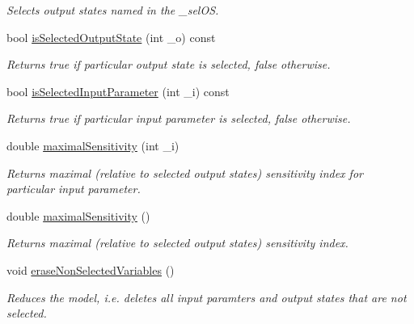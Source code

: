 \begin{DoxyCompactItemize}
\begin{DoxyCompactList}\small\item\em Selects output states named in the \-\_\-sel\-O\-S. \end{DoxyCompactList}\item 
bool \hyperlink{class_go_s_u_m_1_1_c_reduction_a7829e3f9ccd7ebaba29f872aef3072fa}{is\-Selected\-Output\-State} (int \-\_\-o) const 
\begin{DoxyCompactList}\small\item\em Returns true if particular output state is selected, false otherwise. \end{DoxyCompactList}\item 
bool \hyperlink{class_go_s_u_m_1_1_c_reduction_ae930cb202b2a6bda3fceba0b676b9389}{is\-Selected\-Input\-Parameter} (int \-\_\-i) const 
\begin{DoxyCompactList}\small\item\em Returns true if particular input parameter is selected, false otherwise. \end{DoxyCompactList}\item 
double \hyperlink{class_go_s_u_m_1_1_c_reduction_ad510f8a29bce3c9600300926387b6234}{maximal\-Sensitivity} (int \-\_\-i)
\begin{DoxyCompactList}\small\item\em Returns maximal (relative to selected output states) sensitivity index for particular input parameter. \end{DoxyCompactList}\item 
double \hyperlink{class_go_s_u_m_1_1_c_reduction_a04d2abb0f66c0f3a55ae6062e5ada190}{maximal\-Sensitivity} ()
\begin{DoxyCompactList}\small\item\em Returns maximal (relative to selected output states) sensitivity index. \end{DoxyCompactList}\item 
void \hyperlink{class_go_s_u_m_1_1_c_reduction_a02dbd164e53597bdb92706ac54e781cb}{erase\-Non\-Selected\-Variables} ()
\begin{DoxyCompactList}\small\item\em Reduces the model, i.\-e. deletes all input paramters and output states that are not selected. \end{DoxyCompactList}\end{DoxyCompactItemize}
